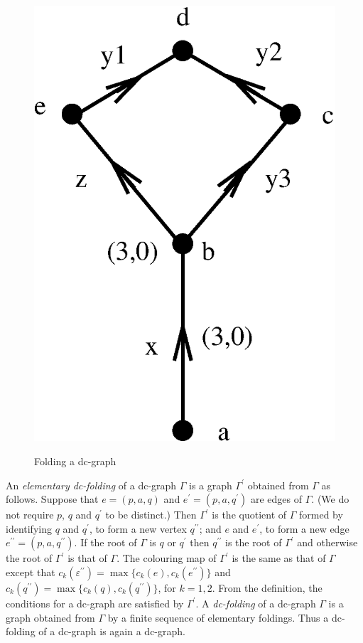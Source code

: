 \documentclass[a4paper,12pt]{article}
\def\e{\varepsilon }
\def\G{\Gamma }
\numberwithin{equation}{section}
\numberwithin{figure}{section}
\begin{document}
\begin{figure}
\begin{center}
{\includegraphics[scale=.5]{dc-folded.eps}
\label{fig:dc-graphb}
}
\end{center}
\caption{Folding a  dc-graph}\label{fig:dc-graph}
\end{figure}
An {\em elementary dc-folding} of a dc-graph $\G$ is a graph $\G^\prime$
obtained from $\G$ as follows. Suppose that $e=(p,a,q)$ and 
$e^\prime=(p,a,q^\prime)$
are edges of $\G$. (We do not require $p$, $q$ and $q^\prime$ to be distinct.) 
 Then $\G^\prime$ is the quotient of $\G$ formed by identifying 
$q$ and $q^\prime$, to form a new vertex $q^{\prime\prime}$; and 
$e$ and $e^\prime$, to form a new edge 
$e^{\prime\prime}=(p,a,q^{\prime\prime})$. If the root of $\G$ is $q$
 or $q^\prime$ then $q^{\prime\prime}$ is the root of $\G^\prime$ and otherwise
 the root of $\G^\prime$ is that of $\G$. The colouring map of $\G^\prime$
is the same as that of $\G$ except that  
 $c_k(\e^{\prime\prime})=\max\{c_k(e),c_k(e^{\prime\prime})\}$ 
and $c_k(q^{\prime\prime})=\max\{c_k(q),c_k(q^{\prime\prime})\}$,
for $k=1,2$. 
From the definition, the conditions for a dc-graph are satisfied by 
$\G^\prime$. A {\em dc-folding} of a dc-graph $\G$ is a graph obtained 
from $\G$ by a finite sequence of elementary foldings. Thus a dc-folding 
of a dc-graph is again a dc-graph. 
\end{document}
